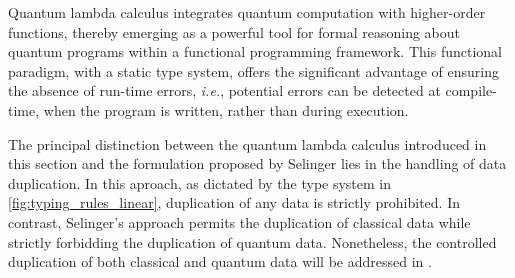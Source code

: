 
Quantum lambda calculus integrates quantum computation with higher-order functions, thereby emerging as a powerful tool for formal reasoning about quantum programs within a functional programming framework. This functional paradigm, with a static type system, offers the significant advantage of ensuring the absence of run-time errors, \textit{i.e.}, potential errors can be detected at compile-time, when the program is written, rather than during execution.

The principal distinction between the quantum lambda calculus introduced in this section and the formulation proposed by Selinger \cite{selinger2006lambda,selinger2009quantum} lies in the handling of data duplication. In this aproach, as dictated by the type system in \autoref{fig:typing_rules_linear}, duplication of any data is strictly prohibited. In contrast, Selinger's approach permits the duplication of classical data while strictly forbidding the duplication of quantum data.
Nonetheless, the controlled duplication of both classical and quantum data will be addressed in .



